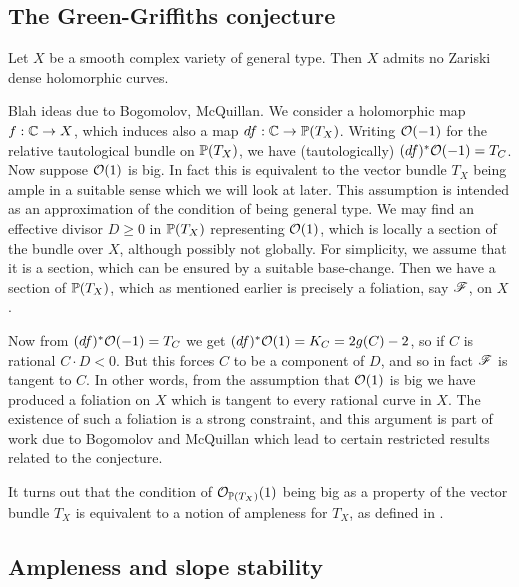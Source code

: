 

\subsection{The Green-Griffiths conjecture}


\begin{conjecture}
    Let $X$ be a smooth complex variety of general type. Then $X$ admits no
    Zariski dense holomorphic curves.
\end{conjecture}

Blah ideas due to Bogomolov, McQuillan. We consider a holomorphic map
$f:\C\to X$, which induces also a map $df:\C\to\P(T_X)$. Writing $\O(-1)$ for
the relative tautological bundle on $\P(T_X)$, we have (tautologically)
$(df)^*\O(-1)=T_C$. Now suppose $\O(1)$ is big. In fact this is equivalent to
the vector bundle $T_X$ being ample in a suitable sense which we will look at
later. %
This assumption is intended as an approximation of the condition of being
general type. We may find an effective divisor $D\ge0$ in $\P(T_X)$ representing
$\O(1)$, which is locally a section of the bundle over $X$, although possibly
not globally. For simplicity, we assume that it is a section, which can be
ensured by a suitable base-change. Then we have a section of $\P(T_X)$, which as
mentioned earlier is precisely a foliation, say $\scrF$, on $X$.

Now from $(df)^*\O(-1)=T_C$ we get $(df)^*\O(1)=K_C=2g(C)-2$, so if $C$ is
rational $C\cdot D<0$. But this forces $C$ to be a component of $D$, and so in
fact $\scrF$ is tangent to $C$. %
In other words, from the assumption that $\O(1)$ is big we have produced a
foliation on $X$ which is tangent to every rational curve in $X$. The existence
of such a foliation is a strong constraint, and this argument is part of work
due to Bogomolov and McQuillan \cite{mcquillan_98} which lead to certain
restricted results related to the conjecture.

It turns out that the condition of $\O_{\P(T_X)}(1)$ being big as a property of
the vector bundle $T_X$ is equivalent to a notion of ampleness for $T_X$, as
defined in \cite{hartshorne_66}. %

\subsection{Ampleness and slope stability}

